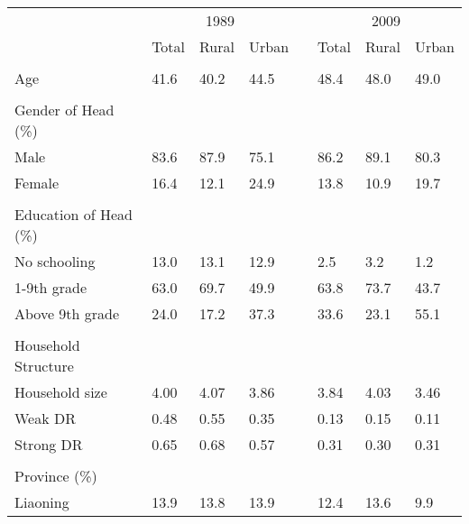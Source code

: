 \begin{tabular}{l p{1cm} p{1cm} p{1cm} c p{1cm} p{1cm} p{1cm}}
\toprule
 & \multicolumn{3}{c}{1989} & & \multicolumn{3}{c}{2009} \\
 & Total & Rural & Urban    & & Total & Rural & Urban    \\
\midrule \\
 Age & 41.6       & 40.2       & 44.5       & & 48.4       & 48.0       & 49.0       \\
\\ Gender of Head (\%) \\
\hspace{.6cm} Male & 83.6       & 87.9       & 75.1       & & 86.2       & 89.1       & 80.3       \\
\hspace{.6cm} Female & 16.4       & 12.1       & 24.9       & & 13.8       & 10.9       & 19.7       \\
\\ Education of Head (\%) \\
\hspace{.6cm} No schooling & 13.0       & 13.1       & 12.9       & & 2.5        & 3.2        & 1.2        \\
\hspace{.6cm} 1-9th grade & 63.0       & 69.7       & 49.9       & & 63.8       & 73.7       & 43.7       \\
\hspace{.6cm} Above 9th grade & 24.0       & 17.2       & 37.3       & & 33.6       & 23.1       & 55.1       \\
\\ Household Structure \\
\hspace{.6cm} Household size & 4.00       & 4.07       & 3.86       & & 3.84       & 4.03       & 3.46       \\
\hspace{.6cm} Weak DR & 0.48       & 0.55       & 0.35       & & 0.13       & 0.15       & 0.11       \\
\hspace{.6cm} Strong DR & 0.65       & 0.68       & 0.57       & & 0.31       & 0.30       & 0.31       \\
\\ Province (\%) \\
\hspace{.6cm} Liaoning & 13.9       & 13.8       & 13.9       & & 12.4       & 13.6       & 9.9        \\

\end{tabular}
